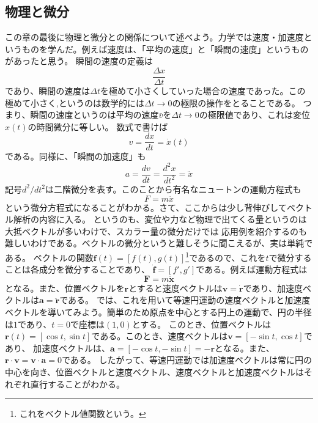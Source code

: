 \documentclass[a4j,dvipdfmx]{jsarticle}
\begin{document}
                \subsection{物理と微分}
                    この章の最後に物理と微分との関係について述べよう。力学では速度・加速度というものを学んだ。例えば速度は、「平均の速度」と「瞬間の速度」というものがあったと思う。
                    瞬間の速度の定義は
                    \begin{equation}
                        \frac{\Delta x}{\Delta t}
                    \end{equation}
                    であり、瞬間の速度は$\Delta t$を極めて小さくしていった場合の速度であった。この極めて小さく,というのは数学的には$\Delta t\to 0$の極限の操作をとることである。
                    つまり、瞬間の速度というのは平均の速度$\bar{v}$を$\Delta t\to 0$の極限値であり、これは変位$x(t)$の時間微分に等しい。
                    数式で書けば
                    \begin{equation}
                        v=\frac{dx}{dt}=\dot{x}(t)
                    \end{equation}
                    である。同様に、「瞬間の加速度」も
                    \begin{equation}
                        a=\frac{dv}{dt}=\frac{d^2 x}{dt^2}=\ddot{x}
                    \end{equation}
                    記号$d^2/dt^2$は二階微分を表す。このことから有名なニュートンの運動方程式も
                    \begin{equation}
                        F=m\ddot{x}
                    \end{equation}
                    という微分方程式になることがわかる。さて、ここからは少し背伸びしてベクトル解析の内容に入る。
                    というのも、変位や力など物理で出てくる量というのは大抵ベクトルが多いわけで、スカラー量の微分だけでは
                    応用例を紹介するのも難しいわけである。ベクトルの微分というと難しそうに聞こえるが、実は単純である。
                    ベクトルの関数$\bm{f}(t) =[f(t),g(t)]$\footnote{これをベクトル値関数という。}であるので、これを$t$で微分することは各成分を微分することであり、
                    $\dot{\bm{f}}=[f',g']$である。例えば運動方程式は
                    \begin{equation}
                        \bm{F}=m\ddot{\bm{x}}\label{eq:ニュートンの運動方程式}
                    \end{equation}
                    となる。また、位置ベクトルを$\bm{r}$とすると速度ベクトルは$\bm{v}=\dot{\bm{r}}$であり、加速度ベクトルは$\bm{a}=\ddot{\bm{r}}$である。
                    では、これを用いて等速円運動の速度ベクトルと加速度ベクトルを導いてみよう。簡単のため原点を中心とする円上の運動で、円の半径は$1$であり、$t=0$で座標は$(1,0)$とする。
                    このとき、位置ベクトルは$\bm{r}(t)=[\cos t,\sin t]$である。このとき、速度ベクトルは$\bm{v}=[-\sin t,\cos t]$であり、
                    加速度ベクトルは、$\bm{a}=[-\cos t,-\sin t]=-\bm{r}$となる。また、$\bm{r}\cdot \bm{v}=\bm{v}\cdot\bm{a}=0$である。
                    したがって、等速円運動では加速度ベクトルは常に円の中心を向き、位置ベクトルと速度ベクトル、速度ベクトルと加速度ベクトルはそれぞれ直行することがわかる。
\end{document}

